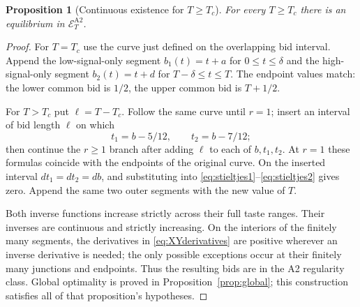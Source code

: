 \documentclass[11pt,a4paper]{article}
\newtheorem{proposition}[theorem]{Proposition}
\theoremstyle{remark}\newtheorem{remark}[theorem]{Remark}
\begin{document}
\begin{proposition}[Continuous existence for $T\ge T_c$]\label{prop:continuouslarge}
For every $T\ge T_c$ there is an equilibrium in $\mathcal E_T^{\mathrm{A2}}$.
\end{proposition}
\begin{proof}
For $T=T_c$ use the curve just defined on the overlapping bid interval. Append the low-signal-only segment $b_1(t)=t+a$ for $0\le t\le\delta$ and the high-signal-only segment $b_2(t)=t+d$ for $T-\delta\le t\le T$. The endpoint values match: the lower common bid is $1/2$, the upper common bid is $T+1/2$.

For $T>T_c$ put $\ell=T-T_c$. Follow the same curve until $r=1$; insert an interval of bid length $\ell$ on which
\[
 t_1=b-5/12,\qquad t_2=b-7/12;
\]
then continue the $r\ge1$ branch after adding $\ell$ to each of $b,t_1,t_2$. At $r=1$ these formulas coincide with the endpoints of the original curve. On the inserted interval $dt_1=dt_2=db$, and substituting into \eqref{eq:stieltjes1}--\eqref{eq:stieltjes2} gives zero. Append the same two outer segments with the new value of $T$.

Both inverse functions increase strictly across their full taste ranges. Their inverses are continuous and strictly increasing. On the interiors of the finitely many segments, the derivatives in \eqref{eq:XYderivatives} are positive wherever an inverse derivative is needed; the only possible exceptions occur at their finitely many junctions and endpoints. Thus the resulting bids are in the A2 regularity class. Global optimality is proved in Proposition~\ref{prop:global}; this construction satisfies all of that proposition's hypotheses.
\end{proof}
\end{document}
